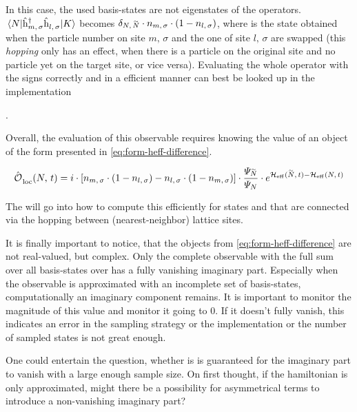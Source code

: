 In this case, the used basis-states are not eigenstates of the operators. 
$\bracketHelper{N}{\withspinhcop{m}{\sigma}{\dagger}\withspinhcop{l}{\sigma}{}}{K}$ becomes $\delta_{N,\,\vphantom{N}\smash{\tilde{N}}}\cdot n_{m,\,\sigma} \cdot (1-n_{l,\,\sigma} )$, where  is the state obtained when the particle number on site $m,\, \sigma$ and the one of site $l,\, \sigma$ are swapped (this \emph{hopping} only has an effect, when there is a particle on the original site and no particle yet on the target site, or vice versa).
Evaluating the whole operator with the signs correctly and in a efficient manner can best be looked up in the implementation 

.

Overall, the evaluation of this observable requires knowing the value of an object of the form presented in \autoref{eq:form-heff-difference}.

\begin{equation}
    \label{eq:form-heff-difference}
    \localObservable{N}{t} =
    i \cdot 
    \left[
        n_{m,\,\sigma} \cdot (1-n_{l,\,\sigma})
        -
        n_{l,\,\sigma} \cdot (1-n_{m,\,\sigma})
    \right]
    \cdot 
    \frac{\psiN[\vphantom{N}\smash{\tilde{N}}]}{\psiN}
    \cdot 
    e^{\HeffOft[\vphantom{N}\smash{\tilde{N}}]-\HeffOft[N]}
\end{equation}

The  will go into how to compute this efficiently for states \ketN[N] and  that are connected via the hopping between (nearest-neighbor) lattice sites.

It is finally important to notice, that the objects from \autoref{eq:form-heff-difference} are not real-valued, but complex.
Only the complete observable with the full sum over all basis-states \ketN over  has a fully vanishing imaginary part. 
Especially when the observable is approximated with an incomplete set of basis-states, computationally an imaginary component remains. 
It is important to monitor the magnitude of this value and monitor it going to $0$.
If it doesn't fully vanish, this indicates an error in the sampling strategy or the implementation or the number of sampled states is not great enough.

One could entertain the question, whether is is guaranteed for the imaginary part to vanish with a large enough sample size.
On first thought, if the hamiltonian is only approximated, might there be a possibility for asymmetrical terms to introduce a non-vanishing imaginary part?


